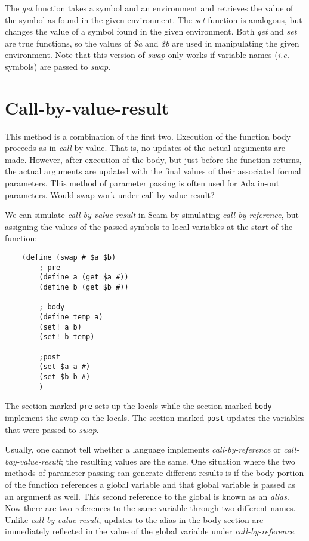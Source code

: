 The {\it get} function takes a symbol and an environment and retrieves the
value of the symbol as found in the given environment.
The {\it set} function is analogous, but changes the value of a symbol
found in the given environment. Both {\it get} and {\it set} are true functions,
so the values of {\it \$a} and {\it \$b} are used in manipulating the given
environment. Note that this version of {\it swap} only works if variable
names ({\it i.e.} symbols) are
passed to {\it swap}.

\section*{Call-by-value-result}

This method is a combination of the first two. Execution of the function
body proceeds as in {\it call}-by-value. That is, no updates of the actual
arguments are made. However, after execution of the body, but just before
the function returns, the actual arguments are updated with the final
values of their associated formal parameters. This method of parameter
passing is often used for Ada in-out parameters. Would swap work under
call-by-value-result? 

We can simulate
{\it call-by-value-result} in Scam by simulating {\it call-by-reference},
but assigning the values of the passed symbols to local
variables at the start of the function:

\begin{verbatim}
    (define (swap # $a $b)
        ; pre
        (define a (get $a #))
        (define b (get $b #))

        ; body
        (define temp a)
        (set! a b)
        (set! b temp)

        ;post
        (set $a a #)
        (set $b b #)
        )
\end{verbatim}

The section marked \verb!pre! sets up the locals while the section marked
\verb!body! implement the swap on the locals. The section marked \verb!post!
updates the variables that were passed to {\it swap}.

Usually, one cannot tell whether a language implements
{\it call-by-reference} or {\it call-bay-value-result};
the resulting values are the same.
One situation where the two methods of parameter passing can
generate different results is if the body portion of the
function references a global variable and that global
variable is passed as an argument as well. This second
reference to the global is known as an {\it alias}. Now there
are two references to the same variable through two different
names.
Unlike {\it call-by-value-result},
updates to the alias in the body section
are immediately reflected in the value
of the global variable under {\it call-by-reference}.


